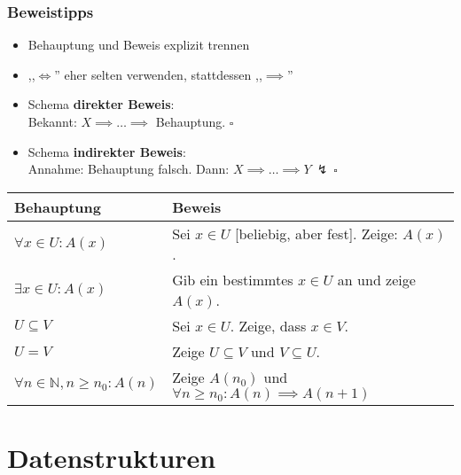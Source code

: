 \renewcommand{\arraystretch}{1.0}
\begin{frame}
  \frametitle{Beweistipps}
  \begin{itemize}
  \item Behauptung und Beweis explizit trennen
  \item ,,$\iff$'' eher selten verwenden, stattdessen ,,$\implies$''
  \item Schema \textbf{direkter Beweis}: \\
        Bekannt: $X \implies \ldots \implies$ Behauptung. $\square$
  \item Schema \textbf{indirekter Beweis}: \\
        Annahme: Behauptung falsch.
        Dann: $X \implies \ldots \implies Y \ \lightning \ \square$
  \end{itemize}

  \begin{center}
  \begin{tabular}{| l || l |} \hline
  \textbf{Behauptung} & \textbf{Beweis} \\ \hline
    $\forall x \in U: A(x)$
      & Sei $x \in U$ [beliebig, aber fest]. Zeige: $A(x)$.
      \\ \hline
    $\exists x \in U: A(x)$
      & Gib ein bestimmtes $x \in U$ an und zeige $A(x)$.
      \\ \hline
    $U \subseteq V$
      & Sei $x \in U$. Zeige, dass $x \in V$.
      \\ \hline
    $U = V$
      & Zeige $U \subseteq V$ und $V \subseteq U$.
      \\ \hline
    $\forall n \in \mathbb{N}, n \geq n_0: A(n)$
      & Zeige $A(n_0)$ und $\forall n \geq n_0: A(n) \implies A(n+1)$
      \\ \hline
  \end{tabular}
  \end{center}
\end{frame}
\renewcommand{\arraystretch}{1.5}

\section{Datenstrukturen}
